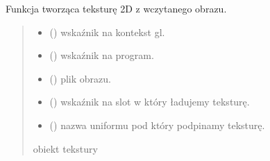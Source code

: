 \documentclass[a4paper,10pt,openany,english]{sphinxmanual}
\begin{document}

\begin{fulllineitems}
\label{\detokenize{js/js-functions:createTextureFromImage}}
\pysigstartsignatures
\pysiglinewithargsret
{}
{\sphinxparamcomma {}\sphinxparamcomma {}\sphinxparamcomma {}\sphinxparamcomma {}}
{}
\pysigstopsignatures
\sphinxAtStartPar
Funkcja tworząca teksturę 2D z wczytanego obrazu.
\begin{quote}\begin{description}
\begin{itemize}
\item {} 
\sphinxAtStartPar
{} () \textendash{} wskaźnik na kontekst gl.

\item {} 
\sphinxAtStartPar
{} () \textendash{} wskaźnik na program.

\item {} 
\sphinxAtStartPar
{} () \textendash{} plik obrazu.

\item {} 
\sphinxAtStartPar
{} () \textendash{} wskaźnik na slot w który ładujemy teksturę.

\item {} 
\sphinxAtStartPar
{} () \textendash{} nazwa uniformu pod który podpinamy teksturę.

\end{itemize}

\sphinxAtStartPar
{} \textendash{} \sphinxhyphen{} obiekt tekstury

\end{description}\end{quote}

\end{fulllineitems}
\end{document}
